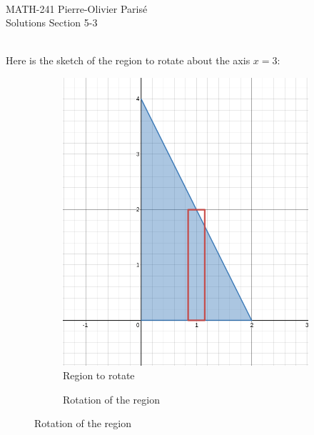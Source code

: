 


	\noindent \hrulefill \\
	MATH-241 \hfill Pierre-Olivier Paris{\'e}\\
	Solutions Section 5-3 \hfill \semester \\\vspace*{-1cm}
	
	\noindent\hrulefill
	
	\spc
	
	\\
	Here is the sketch of the region to rotate about the axis $x = 3$:
		\begin{figure}[h]
		\begin{subfigure}[b]{0.45\textwidth}
		\centering
		\includegraphics[scale=0.3]{5-3_exo16}
		\caption{Region to rotate}
		\end{subfigure}
		\begin{subfigure}[b]{0.45\textwidth}
		\caption{Rotation of the region}
		\end{subfigure}
		\end{figure}
	
